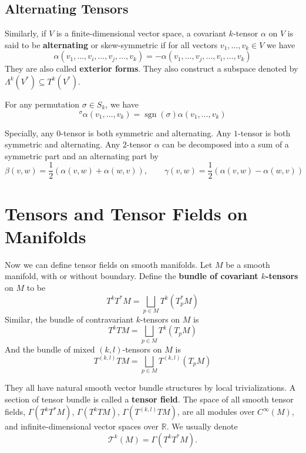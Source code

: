 \documentclass[../main.tex]{subfiles}
\begin{document}
\subsection{Alternating Tensors}
Similarly, if $V$ is a finite-dimensional vector space, a covariant $k$-tensor $\alpha$ on $V$ is said to be \textbf{alternating} or skew-symmetric if for all vectors $v_1, \ldots ,v_k \in V$ we have
\begin{equation}
  \alpha(v_1, \ldots ,v_i, \ldots ,v_j, \ldots ,v_k) = - \alpha(v_1, \ldots ,v_j, \ldots ,v_i, \ldots ,v_k)
\end{equation}
They are also called \textbf{exterior forms}. They also construct a subspace denoted by $\Lambda^k(V^*) \subseteq T^k(V^*)$.

For any permutation $\sigma\in S_k$, we have
\begin{equation*}
  ^\sigma \alpha(v_1, \ldots ,v_k) = \operatorname{sgn}(\sigma) \alpha(v_1, \ldots ,v_k)
\end{equation*}

Specially, any $0$-tensor is both symmetric and alternating. Any $1$-tensor is both symmetric and alternating. Any $2$-tensor $\alpha$ can be decomposed into a sum of a symmetric part and an alternating part by
\begin{equation*}
  \beta(v,w) = \frac{1}{2}(\alpha(v,w) + \alpha(w,v)), \qquad \gamma(v,w) = \frac{1}{2}(\alpha(v,w) - \alpha(w,v))
\end{equation*}

\section{Tensors and Tensor Fields on Manifolds}
Now we can define tensor fields on smooth manifolds. Let $M$ be a smooth manifold, with or without boundary. Define the \textbf{bundle of covariant $k$-tensors} on $M$ to be
\begin{equation}
  T^k T^* M = \bigsqcup_{p\in M} T^k(T_p^* M)
\end{equation}
Similar, the bundle of contravariant $k$-tensors on $M$ is
\begin{equation}
  T^k TM = \bigsqcup_{p\in M} T^k(T_p M)
\end{equation}
And the bundle of mixed $(k,l)$-tensors on $M$ is
\begin{equation}
  T^{(k,l)} TM = \bigsqcup_{p\in M} T^{(k,l)}(T_p M)
\end{equation}

They all have natural smooth vector bundle structures by local trivializations. A section of tensor bundle is called a \textbf{tensor field}. The space of all smooth tensor fields, $\Gamma(T^k T^* M)$, $\Gamma(T^k TM)$, $\Gamma(T^{(k,l)}T M)$, are all modules over $C^\infty(M)$, and infinite-dimensional vector spaces over $\mathbb{R}$. We usually denote
\begin{equation*}
  \mathcal{T}^k(M) = \Gamma(T^k T^* M).
\end{equation*}
\end{document}

